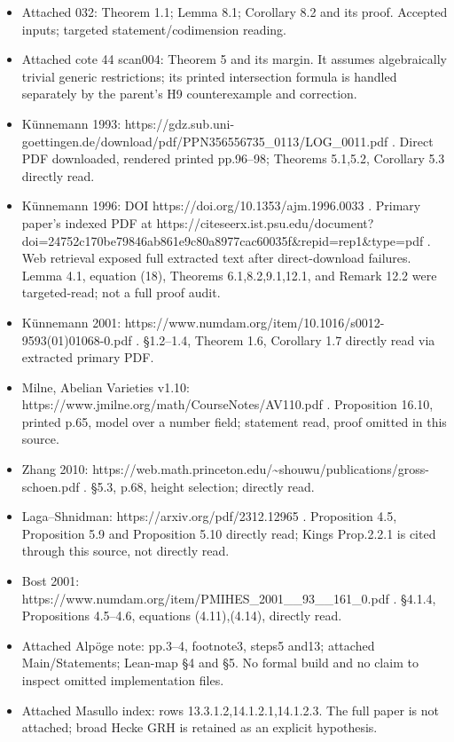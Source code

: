 \begin{itemize}
\tightlist
\item
  Attached 032: Theorem 1.1; Lemma 8.1; Corollary 8.2 and its proof.
  Accepted inputs; targeted statement/codimension reading.
\item
  Attached cote 44 scan004: Theorem 5 and its margin. It assumes
  algebraically trivial generic restrictions; its printed intersection
  formula is handled separately by the parent's H9 counterexample and
  correction.
\item
  Künnemann 1993:
  https://gdz.sub.uni-goettingen.de/download/pdf/PPN356556735\_0113/LOG\_0011.pdf
  . Direct PDF downloaded, rendered printed pp.96--98; Theorems 5.1,5.2,
  Corollary 5.3 directly read.
\item
  Künnemann 1996: DOI https://doi.org/10.1353/ajm.1996.0033 . Primary
  paper's indexed PDF at
  https://citeseerx.ist.psu.edu/document?doi=24752c170be79846ab861e9c80a8977cac60035f\&repid=rep1\&type=pdf
  . Web retrieval exposed full extracted text after direct-download
  failures. Lemma 4.1, equation (18), Theorems 6.1,8.2,9.1,12.1, and
  Remark 12.2 were targeted-read; not a full proof audit.
\item
  Künnemann 2001:
  https://www.numdam.org/item/10.1016/s0012-9593(01)01068-0.pdf .
  §1.2--1.4, Theorem 1.6, Corollary 1.7 directly read via extracted
  primary PDF.
\item
  Milne, Abelian Varieties v1.10:
  https://www.jmilne.org/math/CourseNotes/AV110.pdf . Proposition 16.10,
  printed p.65, model over a number field; statement read, proof omitted
  in this source.
\item
  Zhang 2010:
  https://web.math.princeton.edu/\textasciitilde shouwu/publications/gross-schoen.pdf
  . §5.3, p.68, height selection; directly read.
\item
  Laga--Shnidman: https://arxiv.org/pdf/2312.12965 . Proposition 4.5,
  Proposition 5.9 and Proposition 5.10 directly read; Kings Prop.2.2.1
  is cited through this source, not directly read.
\item
  Bost 2001:
  https://www.numdam.org/item/PMIHES\_2001\_\_93\_\_161\_0.pdf . §4.1.4,
  Propositions 4.5--4.6, equations (4.11),(4.14), directly read.
\item
  Attached Alpöge note: pp.3--4, footnote3, steps5 and13; attached
  Main/Statements; Lean-map §4 and §5. No formal build and no claim to
  inspect omitted implementation files.
\item
  Attached Masullo index: rows 13.3.1.2,14.1.2.1,14.1.2.3. The full
  paper is not attached; broad Hecke GRH is retained as an explicit
  hypothesis.
\end{itemize}

